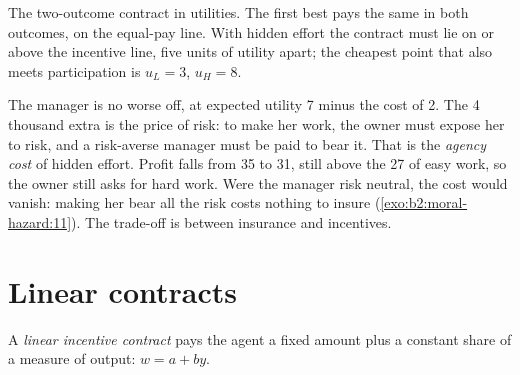 \begin{omfigure}

{\small The two-outcome contract in utilities. The first best pays the same in both outcomes, on the equal-pay line.
With hidden effort the contract must lie on or above the incentive line, five units of utility apart; the cheapest point
that also meets participation is $u_L = 3$, $u_H = 8$.}
\end{omfigure}

The manager is no worse off, at expected utility 7 minus the cost of 2. The 4 thousand extra is the price of risk: to make
her work, the owner must expose her to risk, and a risk-averse manager must be paid to bear it. That is the
\emph{agency cost} of hidden effort. Profit falls from 35 to 31, still above the 27 of easy work, so the owner still asks
for hard work. Were the manager risk neutral, the cost would vanish: making her bear all the risk costs nothing to insure
(\cref{exo:b2:moral-hazard:11}). The trade-off is between insurance and incentives.

\section{Linear contracts}\label{sec:b2:moral-hazard:linear}

\begin{definition}\label{def:b2:moral-hazard:linear-contract}
A \emph{linear incentive contract} pays the agent a fixed amount plus a constant share
of a measure of output: $w = a + by$.
\end{definition}

